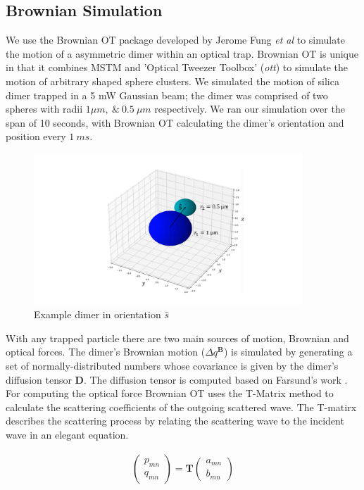 \documentclass[final, 3p]{elsarticle}
\begin{document}
\subsection{Brownian Simulation}
\label{sec:2.1}
We use the Brownian OT package developed by Jerome Fung \textit{et al} \cite{Vigilante2020Brownian_OT} to simulate the motion of a asymmetric dimer within an optical trap. Brownian OT is unique in that it combines MSTM \cite{Mishchenko1996MSTM} and 'Optical Tweezer Toolbox' (\textit{ott}) \cite{Lenton2020} to simulate the motion of arbitrary shaped sphere clusters. We simulated the motion of silica dimer trapped in a 5 mW Gaussian beam; the dimer was comprised of two spheres with radii $1\mu m, \ \& \ 0.5 \ \mu m$ respectively. We ran our simulation over the span of 10 seconds, with Brownian OT calculating the dimer's orientation and position every $1 \ ms$. 

\begin{figure}[h]
	\centering
	\includegraphics[width=0.9\textwidth]{./Images/Dimer.png}
	\caption{Example dimer in orientation $\hat{s}$}
	\label{fig:dimer}
\end{figure}

With any trapped particle there are two main sources of motion, Brownian and optical forces. The dimer's Brownian motion ($\Delta q^{\textbf{B}}$) is simulated by generating a set of normally-distributed numbers whose covariance is given by the dimer's diffusion tensor $\textbf{D}$. The diffusion tensor is computed based on Farsund's work \cite{Farsund1996}. For computing the optical force Brownian OT uses the T-Matrix method to calculate the scattering coefficients of the outgoing scattered wave. The T-matirx describes the scattering process by relating the scattering wave to the incident wave in an elegant equation.

\begin{align}
	\begin{pmatrix}
		p_{mn} \\
		q_{mn}
	\end{pmatrix}
	= \textbf{T}
	\begin{pmatrix}
		a_{mn} \\
		b_{mn}
	\end{pmatrix}
\end{align}
\end{document}
